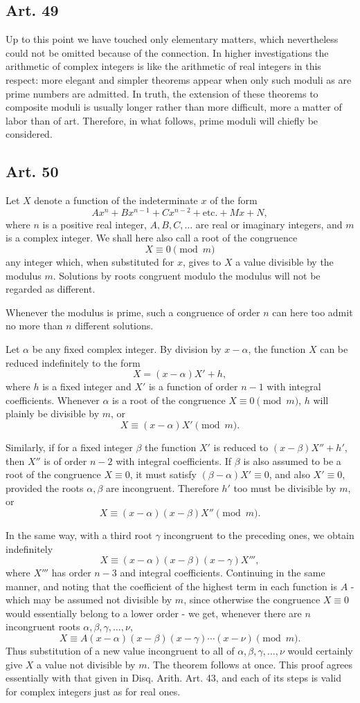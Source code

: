 \documentclass[12pt]{article}
\newcommand{\art}[1]{\subsection*{Art. #1}}
\begin{document}
\art{49}
Up to this point we have touched only elementary matters, which nevertheless could not be omitted because of the connection. In higher investigations the arithmetic of complex integers is like the arithmetic of real integers in this respect: more elegant and simpler theorems appear when only such moduli as are prime numbers are admitted. In truth, the extension of these theorems to composite moduli is usually longer rather than more difficult, more a matter of labor than of art. Therefore, in what follows, prime moduli will chiefly be considered.

\art{50}
Let $X$ denote a function of the indeterminate $x$ of the form
\[
Ax^n+Bx^{n-1}+Cx^{n-2}+\text{etc.}+Mx+N,
\]
where $n$ is a positive real integer, $A,B,C,\ldots$ are real or imaginary integers, and $m$ is a complex integer. We shall here also call a root of the congruence
\[
X\equiv0\pmod m
\]
any integer which, when substituted for $x$, gives to $X$ a value divisible by the modulus $m$. Solutions by roots congruent modulo the modulus will not be regarded as different.

Whenever the modulus is prime, such a congruence of order $n$ can here too admit no more than $n$ different solutions.

Let $\alpha$ be any fixed complex integer. By division by $x-\alpha$, the function $X$ can be reduced indefinitely to the form
\[
X=(x-\alpha)X'+h,
\]
where $h$ is a fixed integer and $X'$ is a function of order $n-1$ with integral coefficients. Whenever $\alpha$ is a root of the congruence $X\equiv0\pmod m$, $h$ will plainly be divisible by $m$, or
\[
X\equiv(x-\alpha)X'\pmod m.
\]

Similarly, if for a fixed integer $\beta$ the function $X'$ is reduced to $(x-\beta)X''+h'$, then $X''$ is of order $n-2$ with integral coefficients. If $\beta$ is also assumed to be a root of the congruence $X\equiv0$, it must satisfy $(\beta-\alpha)X'\equiv0$, and also $X'\equiv0$, provided the roots $\alpha,\beta$ are incongruent. Therefore $h'$ too must be divisible by $m$, or
\[
X\equiv(x-\alpha)(x-\beta)X''\pmod m.
\]

In the same way, with a third root $\gamma$ incongruent to the preceding ones, we obtain indefinitely
\[
X\equiv(x-\alpha)(x-\beta)(x-\gamma)X''',
\]
where $X'''$ has order $n-3$ and integral coefficients. Continuing in the same manner, and noting that the coefficient of the highest term in each function is $A$ - which may be assumed not divisible by $m$, since otherwise the congruence $X\equiv0$ would essentially belong to a lower order - we get, whenever there are $n$ incongruent roots $\alpha,\beta,\gamma,\ldots,\nu$,
\[
X\equiv A(x-\alpha)(x-\beta)(x-\gamma)\cdots(x-\nu)\pmod m.
\]
Thus substitution of a new value incongruent to all of $\alpha,\beta,\gamma,\ldots,\nu$ would certainly give $X$ a value not divisible by $m$. The theorem follows at once. This proof agrees essentially with that given in Disq. Arith. Art. 43, and each of its steps is valid for complex integers just as for real ones.
\end{document}

